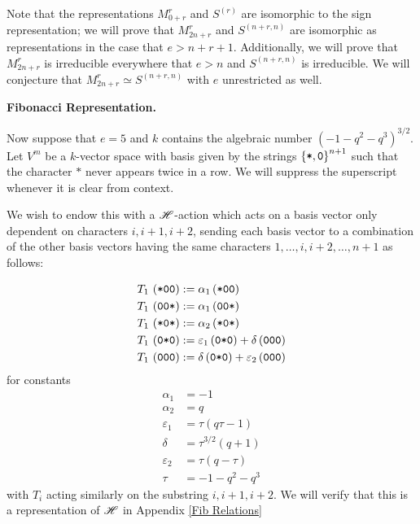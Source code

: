 \documentclass{amsart}
\newcommand{\fakesubsection}[1]{
    \vspace{7pt}
    \noindent \textbf{#1.}
  }
\begin{document}
  Note that the representations $M_{0 + r}^r$ and $S^{(r)}$ are isomorphic to the sign representation; 
  we will prove that $M_{2n+r}^r$ and $S^{(n+r,n)}$ are isomorphic as representations in the case that $e > n + r + 1$.
  Additionally, we will prove that $M_{2n + r}^r$ is irreducible everywhere that $e > n$ and $S^{(n+r,n)}$ is irreducible.
  We will conjecture that $M_{2n + r}^r \simeq S^{(n+r,n)}$ with $e$ unrestricted as well.
    
  \def\vara{\alpha_1}
  \def\varb{\alpha_2}
  \def\varc{\varepsilon_1}
  \def\vard{\delta}
  \def\vare{\varepsilon_2}
  \def\vs{\texttt{*}}
  \def\vp{\texttt{0}}
  \fakesubsection{Fibonacci Representation}
  Now suppose that $e = 5$ and $k$ contains the algebraic number $(-1 - q^2 - q^3)^{3/2}$.
  Let $V^m$ be a $k$-vector space with basis given by the strings $\cbr{\vs,\vp}^{n+1}$ such that the character $\vs$ never appears twice in a row. 
  We will suppress the superscript whenever it is clear from context.

  We wish to endow this with a $\mathscr{H}$-action which acts on a basis vector only dependent on characters $i,i+1,i+2$, sending each basis vector to a combination of the other basis vectors having the same characters $1,\dots,i,i+2,\dots,n+1$ as follows:

  \begin{equation} 
    \begin{split}
      T_1 \, \prn{\vs\vp\vp} &:= \vara\prn{\vs\vp\vp}\\
      T_1 \, \prn{\vp\vp\vs} &:= \vara\prn{\vp\vp\vs}\\
      T_1 \, \prn{\vs\vp\vs} &:= \varb\prn{\vs\vp\vs}\\
      T_1 \, \prn{\vp\vs\vp} &:= \varc\prn{\vp\vs\vp} + \vard\prn{\vp\vp\vp}\\
      T_1 \, \prn{\vp\vp\vp} &:= \vard\prn{\vp\vs\vp} + \vare\prn{\vp\vp\vp}
  \end{split} \label{Fib Action} 
  \end{equation}
  for constants
  \begin{equation}
    \begin{split}
    \vara &= -1\\
    \varb &= q\\
    \varc &= \tau(q\tau - 1)\\
    \vard &= \tau^{3/2}(q + 1)\\
    \vare &= \tau(q-\tau)\\
    \tau &= -1-q^2-q^3
  \end{split} \label{Fib Constants} 
  \end{equation}
  with $T_i$ acting similarly on the substring $i,i+1,i+2$.
  We will verify that this is a representation of $\mathscr{H}$ in Appendix \ref{Fib Relations}
\end{document}

